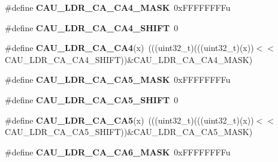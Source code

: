 \begin{DoxyCompactItemize}
\item 
\#define {\bfseries C\+A\+U\+\_\+\+L\+D\+R\+\_\+\+C\+A\+\_\+\+C\+A4\+\_\+\+M\+A\+SK}~0x\+F\+F\+F\+F\+F\+F\+F\+Fu\hypertarget{group__CAU__Register__Masks_gae6080270193ec350954328f66ffc6526}{}\label{group__CAU__Register__Masks_gae6080270193ec350954328f66ffc6526}

\item 
\#define {\bfseries C\+A\+U\+\_\+\+L\+D\+R\+\_\+\+C\+A\+\_\+\+C\+A4\+\_\+\+S\+H\+I\+FT}~0\hypertarget{group__CAU__Register__Masks_ga401e274bfc5075ec0e72d885071c3415}{}\label{group__CAU__Register__Masks_ga401e274bfc5075ec0e72d885071c3415}

\item 
\#define {\bfseries C\+A\+U\+\_\+\+L\+D\+R\+\_\+\+C\+A\+\_\+\+C\+A4}(x)~(((uint32\+\_\+t)(((uint32\+\_\+t)(x))$<$$<$C\+A\+U\+\_\+\+L\+D\+R\+\_\+\+C\+A\+\_\+\+C\+A4\+\_\+\+S\+H\+I\+FT))\&C\+A\+U\+\_\+\+L\+D\+R\+\_\+\+C\+A\+\_\+\+C\+A4\+\_\+\+M\+A\+SK)\hypertarget{group__CAU__Register__Masks_gad677866f6f1b4e9731a6852124fc13c8}{}\label{group__CAU__Register__Masks_gad677866f6f1b4e9731a6852124fc13c8}

\item 
\#define {\bfseries C\+A\+U\+\_\+\+L\+D\+R\+\_\+\+C\+A\+\_\+\+C\+A5\+\_\+\+M\+A\+SK}~0x\+F\+F\+F\+F\+F\+F\+F\+Fu\hypertarget{group__CAU__Register__Masks_gafb0c705253f6e6bde84a7d415b022364}{}\label{group__CAU__Register__Masks_gafb0c705253f6e6bde84a7d415b022364}

\item 
\#define {\bfseries C\+A\+U\+\_\+\+L\+D\+R\+\_\+\+C\+A\+\_\+\+C\+A5\+\_\+\+S\+H\+I\+FT}~0\hypertarget{group__CAU__Register__Masks_gaac2d34d8c6a22632b669e944970f7318}{}\label{group__CAU__Register__Masks_gaac2d34d8c6a22632b669e944970f7318}

\item 
\#define {\bfseries C\+A\+U\+\_\+\+L\+D\+R\+\_\+\+C\+A\+\_\+\+C\+A5}(x)~(((uint32\+\_\+t)(((uint32\+\_\+t)(x))$<$$<$C\+A\+U\+\_\+\+L\+D\+R\+\_\+\+C\+A\+\_\+\+C\+A5\+\_\+\+S\+H\+I\+FT))\&C\+A\+U\+\_\+\+L\+D\+R\+\_\+\+C\+A\+\_\+\+C\+A5\+\_\+\+M\+A\+SK)\hypertarget{group__CAU__Register__Masks_ga38b6e6fffada195c136892a02019c7f4}{}\label{group__CAU__Register__Masks_ga38b6e6fffada195c136892a02019c7f4}

\item 
\#define {\bfseries C\+A\+U\+\_\+\+L\+D\+R\+\_\+\+C\+A\+\_\+\+C\+A6\+\_\+\+M\+A\+SK}~0x\+F\+F\+F\+F\+F\+F\+F\+Fu\hypertarget{group__CAU__Register__Masks_ga36f44124efda969e60d5366ac7cc7350}{}\label{group__CAU__Register__Masks_ga36f44124efda969e60d5366ac7cc7350}


\end{DoxyCompactItemize}
